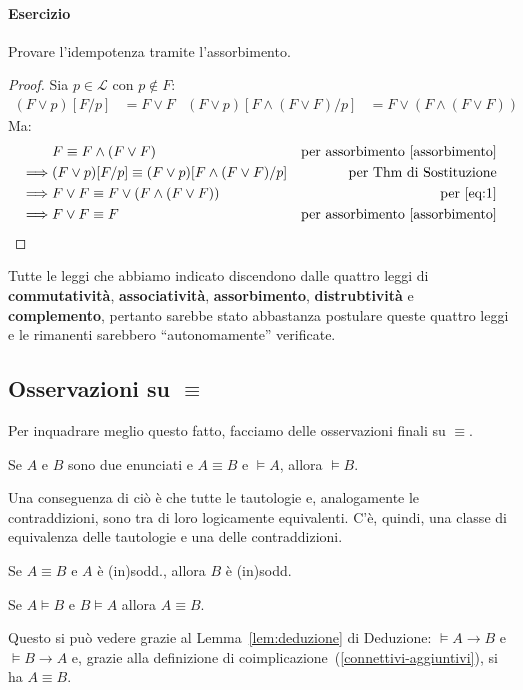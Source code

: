 \paragraph{Esercizio}
Provare l'idempotenza tramite l'assorbimento.
\begin{proof}
  Sia $p \in \mathscr{L}$ con $p \notin F$:
  \begin{align}
    \label{eq:1}
    (F \lor p)[F/p] &= F \lor F & (F \lor p)[F \land (F \lor F)/p] &= F \lor (F \land (F \lor F))
  \end{align}
  Ma:
  \begin{align*} 
     & F \equiv F \land (F \lor F) & \text{per assorbimento \ref{assorbimento}} \\
     \implies & (F \lor p)[F/p] \equiv (F\lor p)[F \land (F \lor F)/p] & \text{per Thm di Sostituzione} \\
     \implies & F \lor F \equiv F \lor (F \land (F \lor F)) & \text{per \ref{eq:1}} \\
     \implies & F \lor F \equiv F & \text{per assorbimento \ref{assorbimento}}
  \end{align*}
\end{proof}
Tutte le leggi che abbiamo indicato discendono dalle 
quattro leggi di \textbf{commutatività}, \textbf{associatività}, 
\textbf{assorbimento}, \textbf{distrubtività} e \textbf{complemento}, 
pertanto sarebbe stato abbastanza postulare queste quattro 
leggi e le rimanenti sarebbero ``autonomamente'' verificate. 

\subsection{Osservazioni su $\equiv$}
Per inquadrare meglio questo fatto, facciamo delle osservazioni finali su $\equiv$. 
\begin{oss}
Se $A$ e $B$ sono due enunciati e $A \equiv B$ e $\models A$,
allora $\models B$.
\end{oss}
Una conseguenza di ciò è che tutte le tautologie e, analogamente le contraddizioni, sono tra di loro logicamente equivalenti. C'è, quindi, una classe di equivalenza delle tautologie e una delle contraddizioni. 

\begin{oss}
Se $A \equiv B$ e $A$ è (in)sodd., allora $B$ è (in)sodd. 
\end{oss}

\begin{oss}
Se $A \models B$ e $B \models A$ allora $A \equiv B$. 
\end{oss}
Questo si può vedere grazie al Lemma~\ref{lem:deduzione} di Deduzione: 
$ \models A \rightarrow B$ e $ \models B \rightarrow A$ e, grazie alla definizione di coimplicazione~(\ref{connettivi-aggiuntivi}), si ha $A \equiv B$. 

